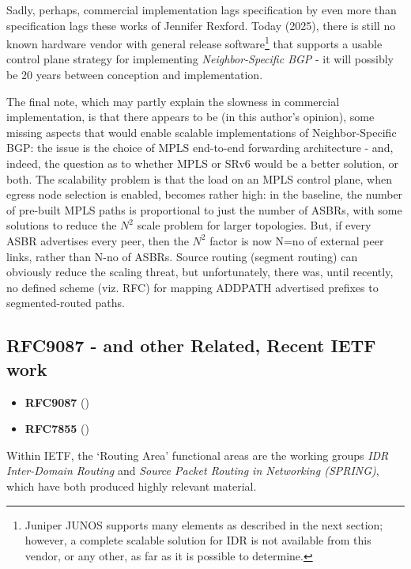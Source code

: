 Sadly, perhaps, commercial implementation lags specification by even more than specification lags these works of Jennifer Rexford.  Today (2025), there is still no known hardware vendor with general release software\footnote{Juniper JUNOS supports many elements as described in the next section; however, a complete scalable solution for IDR is not available from this vendor, or any other, as far as it is possible to determine.} that supports a usable control plane strategy for implementing \emph{Neighbor-Speciﬁc BGP} - it will possibly be 20 years between conception and implementation.

The final note, which may partly explain the slowness in commercial implementation, is that there appears to be (in this author's opinion), some missing aspects that would enable scalable implementations of Neighbor-Speciﬁc BGP: the issue is the choice of MPLS end-to-end forwarding architecture - and, indeed, the question as to whether MPLS or SRv6 would be a better solution, or both.
The scalability problem is that the load on an MPLS control plane, when egress node selection is enabled, becomes rather high: in the baseline, the number of pre-built MPLS paths is proportional to just the number of ASBRs, with some solutions to reduce the $N^2$ scale problem for larger topologies.  But, if every ASBR advertises every peer, then the $N^2$ factor is now N=no of external peer links, rather than N-no of ASBRs.  Source routing (segment routing) can obviously reduce the scaling threat, but unfortunately, there was, until recently, no defined scheme (viz. RFC) for mapping ADDPATH advertised prefixes to segmented-routed paths. 


\subsection{RFC9087 - and other Related, Recent IETF work}

\begin{itemize}
    \item \textbf{RFC9087}  (\citeyear{rfc9087})~\cite{rfc9087}
    \item \textbf{RFC7855}  (\citeyear{rfc7855})~\cite{rfc7855}
\end{itemize}

Within IETF, the `Routing Area' functional areas are the working groups \textit{IDR Inter-Domain Routing} and  \textit{Source Packet Routing in Networking (SPRING)}, which have both produced highly relevant material.

